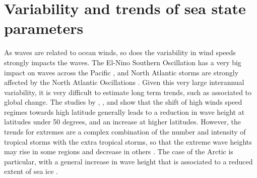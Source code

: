 \section{Variability and trends of sea state parameters}
As waves are related to ocean winds, so does the variability in wind speeds strongly impacts the waves. The El-Nino Southern Oscillation has a very big 
impact on waves across the Pacific \citep{Bromirski&al.2005,Stopa&Cheung2014}, and North Atlantic storms are strongly affected by the North Atlantic 
Oscillations \citep[e.g.][]{Dodet&al.2010,Charles&al.2012}. Given this very large interannual variability, it is very difficult to estimate 
long term trends, such as associated to global change. The studies by \cite{Hemer&al.2013}, \cite{Wang&al.2014}, and \cite{Shimural&al.2016b} show that 
the shift of high winds speed regimes towards high latitude generally leads to a reduction in wave height at latitudes under 50 degrees, and an increase 
at higher latitudes. However, the trends for extremes are a complex combination of the number and intensity of tropical storms with the extra tropical 
storms, so that the extreme wave heights may rise in some regions and decrease in others \citep{Shimural&al.2016b}. The case of the Arctic is particular, 
with a general increase in wave height that is associated to a reduced extent of sea ice \citep{Stopa&al.2016b}.
